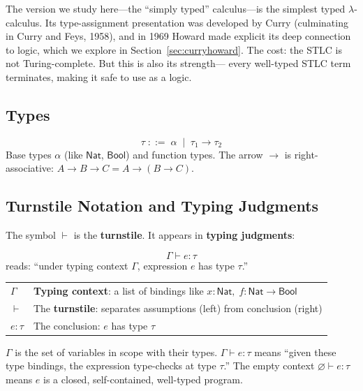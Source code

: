 \documentclass[11pt,a4paper]{article}
\theoremstyle{definition}
\newcommand{\lam}{\lambda}
\newcommand{\proves}{\vdash}
\begin{document}
The version we study here---the ``simply typed'' calculus---is the simplest
typed $\lam$-calculus. Its type-assignment presentation was developed by Curry
(culminating in Curry and Feys, 1958), and in 1969 Howard made explicit its deep
connection to logic, which we explore in Section~\ref{sec:curryhoward}.
The cost: the STLC is not Turing-complete. But this is also its strength---
every well-typed STLC term terminates, making it safe to use as a logic.

\subsection{Types}

\begin{defnbox}
\[
  \tau \;::=\; \alpha \;\mid\; \tau_1 \to \tau_2
\]
Base types $\alpha$ (like $\textsf{Nat}$, $\textsf{Bool}$) and function types.
The arrow $\to$ is right-associative: $A \to B \to C = A \to (B \to C)$.
\end{defnbox}

\subsection{Turnstile Notation and Typing Judgments}\label{sec:turnstile}

The symbol $\proves$ is the \textbf{turnstile}. It appears in \textbf{typing judgments}:

\begin{defnbox}[Reading the Turnstile $\proves$]
\[
  \Gamma \proves e : \tau
\]
reads: ``under typing context $\Gamma$, expression $e$ has type $\tau$.''

\medskip
\begin{tabular}{ll}
$\Gamma$ & \textbf{Typing context}: a list of bindings like $x{:}\textsf{Nat},\; f{:}\textsf{Nat} \to \textsf{Bool}$ \\
$\proves$ & The \textbf{turnstile}: separates assumptions (left) from conclusion (right) \\
$e : \tau$ & The conclusion: $e$ has type $\tau$ \\
\end{tabular}
\end{defnbox}

\begin{intuition}
$\Gamma$ is the set of variables in scope with their types.
$\Gamma \proves e : \tau$ means ``given these type bindings, the expression
type-checks at type $\tau$.'' The empty context $\varnothing \proves e : \tau$
means $e$ is a closed, self-contained, well-typed program.
\end{intuition}
\end{document}
